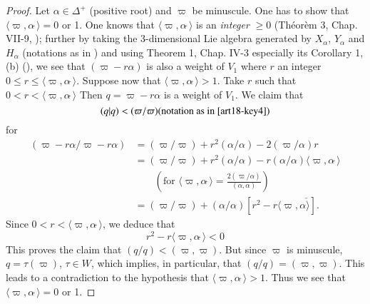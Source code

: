 \begin{proof}
Let $\alpha \in \Delta^+$ (positive root) and $\varpi$ be minuscule. One has to show that $\langle \varpi, \alpha\check ~\rangle =0$ or 1. One knows that $\langle \varpi, \alpha\check ~\rangle$ is an {\em integer } $\geqslant 0$ (\cf Th\'eor\`em 3, Chap. VII-9, \cite{art18-key14}); further by taking the 3-dimensional Lie algebra generated by $X_\alpha$, $Y_\alpha$ and $H_\alpha$ (notations as in \cite{art18-key14}) and using Theorem 1, Chap. IV-3 especially its Corollary 1, (b) (\cf \cite{art18-key14}), we see that $(\varpi-r\alpha)$ is also a weight of $V_1$ where $r$ an integer $0 \leqslant r \leqslant \langle\varpi, \alpha\check 
~\rangle$. Suppose now that $\langle \varpi, \alpha\check ~\rangle > 1$. Take $r$ such that 
$0 < r < \langle \varpi, \alpha \check ~\rangle $ Then $q = \varpi - r\alpha$ is a weight of $V_1$. We claim that 
$$
(q|q) < (\varpi / \varpi) (\text{notation as in  \cite{art18-key4}})
$$
for 
\begin{align*}
(\varpi - r \alpha / \varpi - r \alpha) & = (\varpi/ \varpi) + r^2 (\alpha / \alpha) -2 (\varpi/ \alpha) r\\
& = (\varpi/ \varpi) + r^2 (\alpha/ \alpha) -r(\alpha/\alpha) \langle \varpi, \alpha \check ~ \rangle \\
& \qquad  \left(\text{for }  \langle \varpi, \alpha \check ~ \rangle = \frac{2(\varpi/ \alpha)}{(\alpha, \alpha)}  \right)\\
& = (\varpi/ \varpi) + (\alpha/\alpha) [r^2 - r \langle \varpi, \alpha \check \rangle ].
\end{align*}
Since $0< r< \langle \varpi, \alpha \check ~\rangle $, we deduce that 
$$
r^2 - r \langle \varpi, \alpha \check ~ \rangle < 0
$$
This proves the claim that $(q/q) < (\varpi, \varpi)$. But since $\varpi$ is minuscule, $q = \tau(\varpi)$, $\tau \in W$, which implies, in particular, that $(q/q) = (\varpi, \varpi)$. This leads to a contradiction to the hypothesis that $\langle \varpi, \alpha \check ~\rangle > 1$. Thus we see that $\langle \varpi , \alpha \check ~\rangle  = 0$ or 1.


\end{proof}
